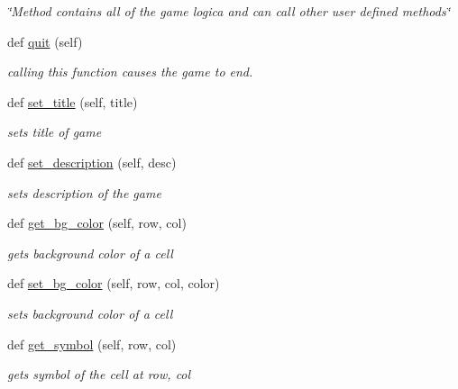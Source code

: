 \begin{DoxyCompactItemize}
\begin{DoxyCompactList}\small\item\em \char`\"{}\+Method contains all of the game logica and can call other user defined methods\char`\"{} \end{DoxyCompactList}\item 
def \hyperlink{classbridges_1_1gamebase_1_1_game_base_a21742d4e630fa64dc76848c7b4fcb344}{quit} (self)
\begin{DoxyCompactList}\small\item\em calling this function causes the game to end. \end{DoxyCompactList}\item 
def \hyperlink{classbridges_1_1gamebase_1_1_game_base_a7e7d4033c4b191b3699dbf0cb5f25933}{set\+\_\+title} (self, title)
\begin{DoxyCompactList}\small\item\em sets title of game \end{DoxyCompactList}\item 
def \hyperlink{classbridges_1_1gamebase_1_1_game_base_a75ecd56daf08036207772d6ce81c90b1}{set\+\_\+description} (self, desc)
\begin{DoxyCompactList}\small\item\em sets description of the game \end{DoxyCompactList}\item 
def \hyperlink{classbridges_1_1gamebase_1_1_game_base_a2e1fd4365bf805a85c19bef1eb197b22}{get\+\_\+bg\+\_\+color} (self, row, col)
\begin{DoxyCompactList}\small\item\em gets background color of a cell \end{DoxyCompactList}\item 
def \hyperlink{classbridges_1_1gamebase_1_1_game_base_a669740699d8d3a848172febbfbfa174f}{set\+\_\+bg\+\_\+color} (self, row, col, color)
\begin{DoxyCompactList}\small\item\em sets background color of a cell \end{DoxyCompactList}\item 
def \hyperlink{classbridges_1_1gamebase_1_1_game_base_a80a3f5e32f8d0ad45c3f72d3c3e134e3}{get\+\_\+symbol} (self, row, col)
\begin{DoxyCompactList}\small\item\em gets symbol of the cell at row, col \end{DoxyCompactList}\item 

\end{DoxyCompactItemize}
